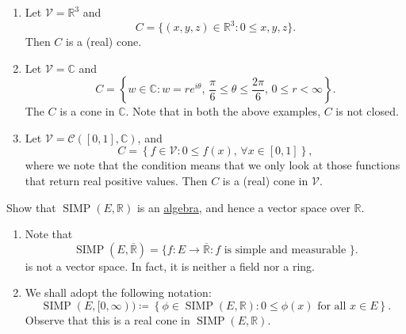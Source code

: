 \documentclass[notoc,notitlepage]{tufte-book}
\DeclareMathOperator{\SIMP}{SIMP}
\begin{document}
\begin{eg}
  \begin{enumerate}
    \item Let $\mathcal{V} = \mathbb{R}^3$ and
      \begin{equation*}
        C = \{ (x, y, z) \in \mathbb{R}^3 : 0 \leq x, y, z \}.
      \end{equation*}
      Then $C$ is a (real) cone.
    \item Let $\mathcal{V} = \mathbb{C}$ and 
      \begin{equation*}
        C = \left\{ w \in \mathbb{C} : w = re^{i\theta},\, \frac{\pi}{6} \leq
        \theta \leq \frac{2\pi}{6},\, 0 \leq r < \infty \right\}.
      \end{equation*}
      The $C$ is a cone in $\mathbb{C}$. Note that in both the above examples,
      $C$ is not closed.
    \item Let $\mathcal{V} = \mathcal{C}([0, 1], \mathbb{C})$, and
      \begin{equation*}
        C = \left\{ f \in \mathcal{V} : 0 \leq f(x),\, \forall x \in [0, 1]
        \right\},
      \end{equation*}
      where we note that the condition means that we only look at those
      functions that return real positive values. Then $C$ is a (real) cone in
      $\mathcal{V}$.
  \end{enumerate}
\end{eg}

\begin{ex}
  Show that $\SIMP(E, \mathbb{R})$ is an
  \hyperref[defn:algebra_of_sets]{algebra}, and hence a vector space over
  $\mathbb{R}$.
\end{ex}

\begin{remark}
  \begin{enumerate}
    \item Note that
      \begin{equation*}
        \SIMP(E, \overline{\mathbb{R}}) = \{ f : E \to \overline{\mathbb{R}} : f
        \text{ is simple and measurable } \}.
      \end{equation*}
      is not a vector space. In fact, it is neither a field nor a ring.
    \item We shall adopt the following notation:
      \begin{equation*}
        \SIMP(E, [0, \infty)) \coloneqq \left\{ \phi \in \SIMP(E, \mathbb{R}) :
        0 \leq \phi(x) \text{ for all } x \in E \right\}.
      \end{equation*}
      Observe that this is a real cone in $\SIMP(E, \mathbb{R})$.
  \end{enumerate}
\end{remark}
\end{document}
